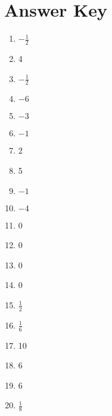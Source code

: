 \section{Answer Key}

\begin{enumerate}
	\item $-\frac{1}{2}$
	\item 4
	\item $-\frac{1}{2}$
	\item $-6$
	\item $-3$
	\item $-1$
	\item 2
	\item 5
	
	\item $-1$
	\item $-4$
	\item 0
	\item 0
	\item 0
	\item 0
	\item $\frac{1}{2}$
	\item $\frac{1}{6}$
	\item 10
	\item 6
	\item 6
	\item $\frac{1}{8}$
\end{enumerate}